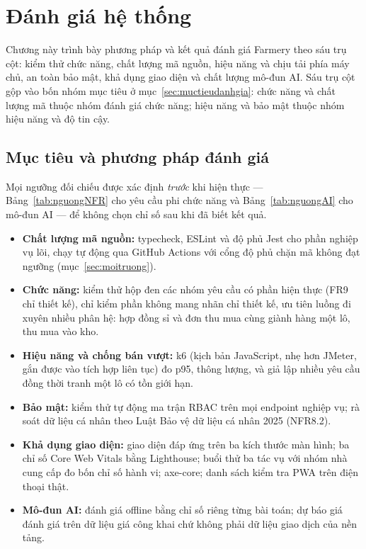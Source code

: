 \chapter{Đánh giá hệ thống}
\label{chap:danhgia}

Chương này trình bày phương pháp và kết quả đánh giá Farmery theo sáu trụ cột: kiểm thử chức năng, chất lượng mã nguồn, hiệu năng và chịu tải phía máy chủ, an toàn bảo mật, khả dụng giao diện và chất lượng mô-đun AI. Sáu trụ cột gộp vào bốn nhóm mục tiêu ở mục~\ref{sec:muctieudanhgia}: chức năng và chất lượng mã thuộc nhóm đánh giá chức năng; hiệu năng và bảo mật thuộc nhóm hiệu năng và độ tin cậy.

\section{Mục tiêu và phương pháp đánh giá}
\label{sec:muctieuphuongphap}

Mọi ngưỡng đối chiếu được xác định \emph{trước} khi hiện thực --- Bảng~\ref{tab:nguongNFR} cho yêu cầu phi chức năng và Bảng~\ref{tab:nguongAI} cho mô-đun AI --- để không chọn chỉ số sau khi đã biết kết quả.
\begin{itemize}
    \item \textbf{Chất lượng mã nguồn:} typecheck, ESLint và độ phủ Jest cho phần nghiệp vụ lõi, chạy tự động qua GitHub Actions với cổng độ phủ chặn mã không đạt ngưỡng (mục~\ref{sec:moitruong}).
    \item \textbf{Chức năng:} kiểm thử hộp đen các nhóm yêu cầu có phần hiện thực (FR9 chỉ thiết kế), chỉ kiểm phần không mang nhãn chỉ thiết kế, ưu tiên luồng đi xuyên nhiều phân hệ: hợp đồng sỉ và đơn thu mua cùng giành hàng một lô, thu mua vào kho.
    \item \textbf{Hiệu năng và chống bán vượt:} k6 (kịch bản JavaScript, nhẹ hơn JMeter, gắn được vào tích hợp liên tục) đo p95, thông lượng, và giả lập nhiều yêu cầu đồng thời tranh một lô có tồn giới hạn.
    \item \textbf{Bảo mật:} kiểm thử tự động ma trận RBAC trên mọi endpoint nghiệp vụ; rà soát dữ liệu cá nhân theo Luật Bảo vệ dữ liệu cá nhân 2025 (NFR8.2).
    \item \textbf{Khả dụng giao diện:} giao diện đáp ứng trên ba kích thước màn hình; ba chỉ số Core Web Vitals bằng Lighthouse; buổi thử ba tác vụ với nhóm nhà cung cấp đo bốn chỉ số hành vi; axe-core; danh sách kiểm tra PWA trên điện thoại thật.
    \item \textbf{Mô-đun AI:} đánh giá offline bằng chỉ số riêng từng bài toán; dự báo giá đánh giá trên dữ liệu giá công khai chứ không phải dữ liệu giao dịch của nền tảng.
\end{itemize}

